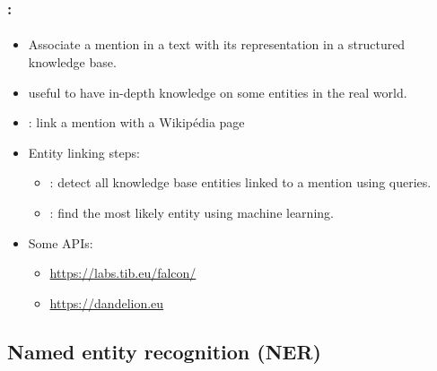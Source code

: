 \documentclass[xcolor=table]{beamer}
\begin{document}
\begin{frame}
	\frametitle{\insertshortsubtitle: \insertsection}
	\framesubtitle{\insertsubsection}
	
	\begin{itemize}
		\item Associate a mention in a text with its representation in a structured knowledge base.
		\item useful to have in-depth knowledge on some entities in the real world.
		\item {}: link a mention with a Wikipédia page
		\item Entity linking steps: 
		\begin{itemize}
			\item {}: detect all knowledge base entities linked to a mention using queries.
			\item {}: find the most likely entity using machine learning.
		\end{itemize}
		\item Some APIs: 
		\begin{itemize}
			\item \url{https://labs.tib.eu/falcon/}
			\item \url{https://dandelion.eu}
		\end{itemize}
	\end{itemize}
	
\end{frame}

\subsection{Named entity recognition (NER)}
\end{document}
